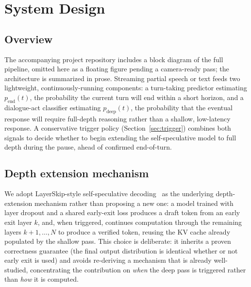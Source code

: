 \documentclass[journal]{IEEEtran}
\begin{document}
\section{System Design}
\label{sec:design}

\subsection{Overview}
The accompanying project repository includes a block diagram of the full pipeline, omitted here as a floating figure pending a camera-ready pass; the architecture is summarized in prose. Streaming partial speech or text feeds two lightweight, continuously-running components: a turn-taking predictor estimating $p_{\text{end}}(t)$, the probability the current turn will end within a short horizon, and a dialogue-act classifier estimating $p_{\text{deep}}(t)$, the probability that the eventual response will require full-depth reasoning rather than a shallow, low-latency response. A conservative trigger policy (Section~\ref{sec:trigger}) combines both signals to decide whether to begin extending the self-speculative model to full depth during the pause, ahead of confirmed end-of-turn.

\subsection{Depth extension mechanism}
We adopt LayerSkip-style self-speculative decoding~\cite{elhoushi2024layerskip} as the underlying depth-extension mechanism rather than proposing a new one: a model trained with layer dropout and a shared early-exit loss produces a draft token from an early exit layer $k$, and, when triggered, continues computation through the remaining layers $k{+}1,\dots,N$ to produce a verified token, reusing the KV cache already populated by the shallow pass. This choice is deliberate: it inherits a proven correctness guarantee (the final output distribution is identical whether or not early exit is used) and avoids re-deriving a mechanism that is already well-studied, concentrating the contribution on \emph{when} the deep pass is triggered rather than \emph{how} it is computed.
\end{document}
